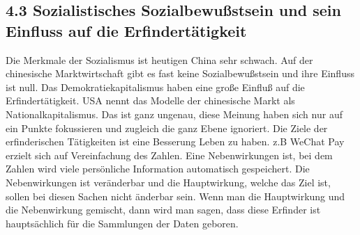 \documentclass[11pt,a4paper]{article}
\begin{document}
\subsection{4.3 Sozialistisches Sozialbewußstsein und sein Einfluss auf die
  Erfindertätigkeit} 

Die Merkmale der Sozialismus ist heutigen China sehr schwach. Auf der
chinesische Marktwirtschaft gibt es fast keine Sozialbewußstsein und ihre
Einfluss ist null. Das Demokratiekapitalismus haben eine große Einfluß auf die
Erfindertätigkeit. USA nennt das Modelle der chinesische Markt als
Nationalkapitalismus. Das ist ganz ungenau, diese Meinung haben sich nur auf
ein Punkte fokussieren und zugleich die ganz Ebene ignoriert. Die Ziele der
erfinderischen Tätigkeiten ist eine Besserung Leben zu haben. z.B WeChat Pay
erzielt sich auf Vereinfachung des Zahlen. Eine Nebenwirkungen ist, bei dem
Zahlen wird viele persönliche Information automatisch gespeichert. Die
Nebenwirkungen ist veränderbar und die Hauptwirkung, welche das Ziel ist,
sollen bei diesen Sachen nicht änderbar sein. Wenn man die Hauptwirkung und
die Nebenwirkung gemischt, dann wird man sagen, dass diese Erfinder ist
hauptsächlich für die Sammlungen der Daten geboren.
\end{document}
